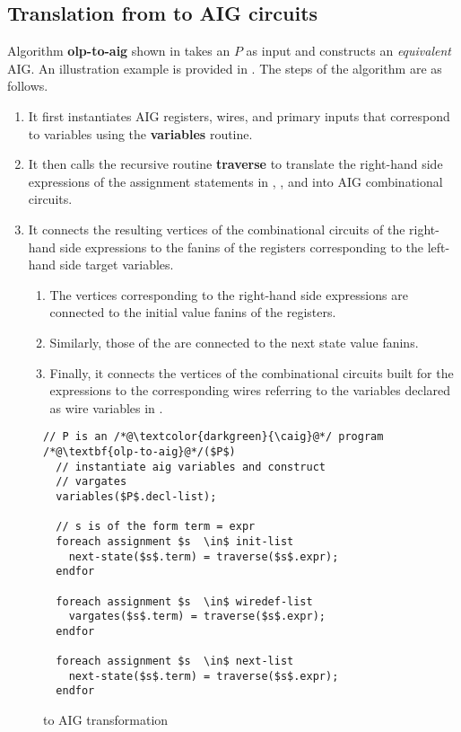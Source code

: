 \subsection{Translation from \caig to AIG circuits}
%
Algorithm {\bf olp-to-aig} shown in   
takes an \caig $P$ as input and constructs an {\em equivalent}
AIG. An illustration example is provided in  
.
%
The steps of the algorithm are as follows.
%
\begin{enumerate}
  \item It first instantiates AIG 
registers, wires, and primary
inputs that correspond to \caig variables 
using the {\bf variables} routine.

\item It then calls the recursive routine {\bf traverse} 
  to translate the right-hand side expressions 
of the assignment statements in 
    , ,
and  into AIG combinational circuits. 
\item It connects the resulting vertices of the combinational 
circuits of the right-hand side expressions to the fanins of the registers corresponding to the left-hand side target variables. 
    \begin{enumerate}
\item The vertices corresponding to the  
  right-hand side expressions are connected to the  
  initial value fanins of the registers. 
\item Similarly, those of the  are connected to 
  the next state value fanins. 
\item Finally, it connects the vertices of the combinational 
  circuits built for the  expressions to 
  the corresponding wires referring to the 
  variables declared as wire variables in .
    \end{enumerate}
\end{enumerate}
\begin{figure}
\begin{lstlisting}
// P is an /*@\textcolor{darkgreen}{\caig}@*/ program
/*@\textbf{olp-to-aig}@*/($P$) 
  // instantiate aig variables and construct
  // vargates
  variables($P$.decl-list); 
  
  // s is of the form term = expr 
  foreach assignment $s  \in$ init-list 
    next-state($s$.term) = traverse($s$.expr);  
  endfor
  
  foreach assignment $s  \in$ wiredef-list
    vargates($s$.term) = traverse($s$.expr);  
  endfor
  
  foreach assignment $s  \in$ next-list
    next-state($s$.term) = traverse($s$.expr);  
  endfor
\end{lstlisting}
\vspace*{-1em}
\caption{\caig to AIG transformation }
\label{fig:olp2aig}
\end{figure}
%
